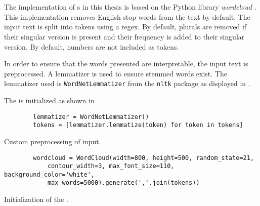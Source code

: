 \section{\wordcloud{}}\label{sec:impl-wordcloud}

The implementation of \wordcloud{}s in this thesis is based on the Python library \textit{wordcloud} \cite{wordcloud-dev}.
This implementation removes English stop words from the text by default.
The input text is split into tokens using a regex.
By default, plurals are removed if their singular version is present and their frequency is added to their singular version.
By default, numbers are not included as tokens.

In order to ensure that the words presented are interpretable, the input text is preprocessed.
A lemmatizer is used to ensure stemmed words exist.
The lemmatizer used is \texttt{WordNetLemmatizer} from the \texttt{nltk} package as displayed in .

The \wordcloud{} is initialized as shown in .

\begin{listing}[htp]
    \begin{verbatim}
        lemmatizer = WordNetLemmatizer()
        tokens = [lemmatizer.lemmatize(token) for token in tokens]
    \end{verbatim}
    \caption[Custom preprocessing of \wordcloud{} input]
    {Custom preprocessing of \wordcloud{} input.
    }
    \label{lst:impl-preproc-wordcloud}
\end{listing}

\begin{listing}[htp]
    \begin{verbatim}
        wordcloud = WordCloud(width=800, height=500, random_state=21, 
            contour_width=3, max_font_size=110, background_color='white', 
            max_words=5000).generate(','.join(tokens))
    \end{verbatim}
    \caption[Initialization of the \wordcloud{}]
    {Initialization of the \wordcloud{}.
    }
    \label{lst:impl-wordcloud}
\end{listing}

